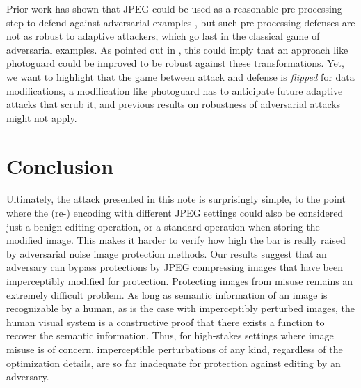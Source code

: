 \documentclass{article} %
\begin{document}
Prior work has shown that JPEG could be used as a reasonable pre-processing step to defend against adversarial examples \citep{das2017keeping}, but such pre-processing defenses are not as robust to adaptive attackers, which go last in the classical game of adversarial examples. As pointed out in \citet{salman2023raising}, this could imply that an approach like photoguard could be improved to be robust against these transformations. Yet, we want to highlight that the game between attack and defense is \textit{flipped} for data modifications, a modification like photoguard has to anticipate future adaptive attacks that scrub it, and previous results on robustness of adversarial attacks might not apply.


\section{Conclusion}

Ultimately, the attack presented in this note is surprisingly simple, to the point where the (re-) encoding with different JPEG settings could also be considered just a benign editing operation, or a standard operation when storing the modified image. This makes it harder to verify how high the bar is really raised by adversarial noise image protection methods. Our results suggest that an adversary can bypass protections by JPEG compressing images that have been imperceptibly modified for protection. Protecting images from misuse remains an extremely difficult problem. As long as semantic information of an image is recognizable by a human, as is the case with imperceptibly perturbed images, the human visual system is a constructive proof that there exists a function to recover the semantic information. Thus, for high-stakes settings where image misuse is of concern, imperceptible perturbations of any kind, regardless of the optimization details, are so far inadequate for protection against editing by an adversary.


\end{document}
